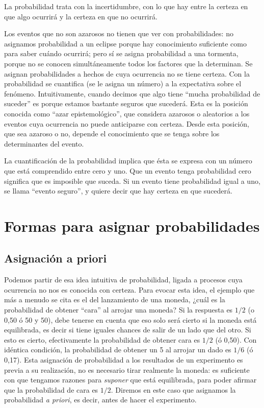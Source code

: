 \documentclass[]{book}
\begin{document}
La probabilidad trata con la incertidumbre, con lo que hay entre la
certeza en que algo ocurrirá y la certeza en que no ocurrirá.

Los eventos que no son azarosos no tienen que ver con probabilidades: no
asignamos probabilidad a un eclipse porque hay conocimiento suficiente
como para saber cuándo ocurrirá; pero sí se asigna probabilidad a una
tormenta, porque no se conocen simultáneamente todos los factores que la
determinan. Se asignan probabilidades a hechos de cuya ocurrencia no se
tiene certeza. Con la probabilidad se cuantifica (se le asigna un
número) a la expectativa sobre el fenómeno. Intuitivamente, cuando
decimos que algo tiene ``mucha probabilidad de suceder'' es porque estamos
bastante seguros que sucederá. Esta es la posición conocida como ``azar
epistemológico'', que considera azarosos o aleatorios a los eventos cuya
ocurrencia no puede anticiparse con certeza. Desde esta posición, que
sea azaroso o no, depende el conocimiento que se tenga sobre los
determinantes del evento.

La cuantificación de la probabilidad implica que ésta se expresa con un
número que está comprendido entre cero y uno. Que un evento tenga
probabilidad cero significa que es imposible que suceda. Si un evento
tiene probabilidad igual a uno, se llama ``evento seguro'', y quiere decir
que hay certeza en que sucederá.

\hypertarget{formas-para-asignar-probabilidades}{%
\section{Formas para asignar probabilidades}\label{formas-para-asignar-probabilidades}}

\hypertarget{asignaciuxf3n-a-priori}{%
\subsection{Asignación a priori}\label{asignaciuxf3n-a-priori}}

Podemos partir de esa idea intuitiva de probabilidad, ligada a procesos
cuya ocurrencia no nos es conocida con certeza. Para evocar esta idea,
el ejemplo que más a menudo se cita es el del lanzamiento de una moneda,
¿cuál es la probabilidad de obtener ``cara'' al arrojar una moneda? Si la
respuesta es \(1/2\) (o 0,50 ó 50 y 50), debe tenerse en cuenta que eso solo
será cierto si la moneda está equilibrada, es decir si tiene iguales
chances de salir de un lado que del otro. Si esto es cierto,
efectivamente la probabilidad de obtener cara es \(1/2\) (ó 0,50). Con
idéntica condición, la probabilidad de obtener un 5 al arrojar un dado
es \(1/6\) (ó 0,17). Esta asignación de probabilidad a los resultados de un
experimento es previa a su realización, no es necesario tirar realmente
la moneda: es suficiente con que tengamos razones para \emph{suponer} que
está equilibrada, para poder afirmar que la probabilidad de cara es \(1/2\).
Diremos en este caso que asignamos la probabilidad \emph{a priori}, es decir,
antes de hacer el experimento.
\end{document}
